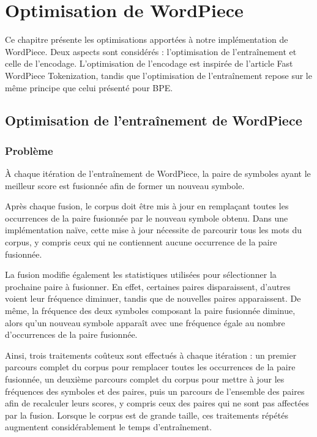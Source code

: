\documentclass[12pt,a4paper]{report}
\begin{document}
	\chapter{Optimisation de WordPiece}
	
	Ce chapitre présente les optimisations apportées à notre implémentation de WordPiece. Deux aspects sont considérés : l'optimisation de l'entraînement et celle de l'encodage. L'optimisation de l'encodage est inspirée de l'article Fast WordPiece Tokenization, tandis que l'optimisation de l'entraînement repose sur le même principe que celui présenté pour BPE.

	\section{Optimisation de l'entraînement de WordPiece}
	
	\subsection{Problème}
	
	À chaque itération de l'entraînement de WordPiece, la paire de symboles ayant le meilleur score est fusionnée afin de former un nouveau symbole.
	
	Après chaque fusion, le corpus doit être mis à jour en remplaçant toutes les occurrences de la paire fusionnée par le nouveau symbole obtenu. Dans une implémentation naïve, cette mise à jour nécessite de parcourir tous les mots du corpus, y compris ceux qui ne contiennent aucune occurrence de la paire fusionnée.
	
	La fusion modifie également les statistiques utilisées pour sélectionner la prochaine paire à fusionner. En effet, certaines paires disparaissent, d'autres voient leur fréquence diminuer, tandis que de nouvelles paires apparaissent. De même, la fréquence des deux symboles composant la paire fusionnée diminue, alors qu'un nouveau symbole apparaît avec une fréquence égale au nombre d'occurrences de la paire fusionnée.
	
	Ainsi, trois traitements coûteux sont effectués à chaque itération : un premier parcours complet du corpus pour remplacer toutes les occurrences de la paire fusionnée, un deuxième parcours complet du corpus pour mettre à jour les fréquences des symboles et des paires, puis un parcours de l'ensemble des paires afin de recalculer leurs scores, y compris ceux des paires qui ne sont pas affectées par la fusion. Lorsque le corpus est de grande taille, ces traitements répétés augmentent considérablement le temps d'entraînement.
	
\end{document}
